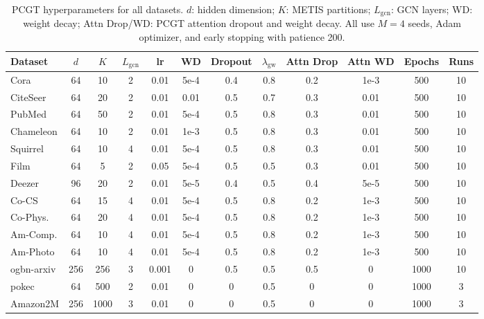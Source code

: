 \documentclass[manuscript, screen, review, anonymous]{acmart}
\begin{document}
\begin{table}[t]
\caption{PCGT hyperparameters for all datasets. $d$: hidden dimension; $K$: METIS partitions; $L_\text{gcn}$: GCN layers; WD: weight decay; Attn Drop/WD: PCGT attention dropout and weight decay. All use $M=4$ seeds, Adam optimizer, and early stopping with patience 200.}
\label{tab:hyperparams}
\centering
\small
\begin{tabular}{l|ccccccccccc}
\toprule
\textbf{Dataset} & $d$ & $K$ & $L_\text{gcn}$ & \textbf{lr} & \textbf{WD} & \textbf{Dropout} & $\lambda_\text{gw}$ & \textbf{Attn Drop} & \textbf{Attn WD} & \textbf{Epochs} & \textbf{Runs} \\
\midrule
Cora         & 64  & 10  & 2 & 0.01  & 5e-4  & 0.4 & 0.8 & 0.2 & 1e-3 & 500  & 10 \\
CiteSeer     & 64  & 20  & 2 & 0.01  & 0.01  & 0.5 & 0.7 & 0.3 & 0.01 & 500  & 10 \\
PubMed       & 64  & 50  & 2 & 0.01  & 5e-4  & 0.5 & 0.8 & 0.3 & 0.01 & 500  & 10 \\
Chameleon    & 64  & 10  & 2 & 0.01  & 1e-3  & 0.5 & 0.8 & 0.3 & 0.01 & 500  & 10 \\
Squirrel     & 64  & 10  & 4 & 0.01  & 5e-4  & 0.5 & 0.8 & 0.3 & 0.01 & 500  & 10 \\
Film         & 64  & 5   & 2 & 0.05  & 5e-4  & 0.5 & 0.5 & 0.3 & 0.01 & 500  & 10 \\
Deezer       & 96  & 20  & 2 & 0.01  & 5e-5  & 0.4 & 0.5 & 0.4 & 5e-5 & 500  & 10 \\
Co-CS        & 64  & 15  & 4 & 0.01  & 5e-4  & 0.5 & 0.8 & 0.2 & 1e-3 & 500  & 10 \\
Co-Phys.     & 64  & 20  & 4 & 0.01  & 5e-4  & 0.5 & 0.8 & 0.2 & 1e-3 & 500  & 10 \\
Am-Comp.     & 64  & 10  & 4 & 0.01  & 5e-4  & 0.5 & 0.8 & 0.2 & 1e-3 & 500  & 10 \\
Am-Photo     & 64  & 10  & 4 & 0.01  & 5e-4  & 0.5 & 0.8 & 0.2 & 1e-3 & 500  & 10 \\
\midrule
ogbn-arxiv   & 256 & 256 & 3 & 0.001 & 0     & 0.5 & 0.5 & 0.5 & 0    & 1000 & 10 \\
pokec        & 64  & 500 & 2 & 0.01  & 0     & 0   & 0.5 & 0   & 0    & 1000 & 3 \\
Amazon2M     & 256 & 1000 & 3 & 0.01 & 0     & 0   & 0.5 & 0   & 0    & 1000 & 3 \\
\bottomrule
\end{tabular}
\end{table}
\end{document}
